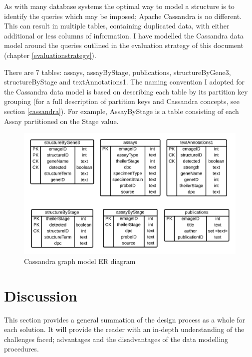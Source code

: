 As with many database systems the optimal way to model a structure is to identify the queries which may be imposed; Apache Cassandra is no different. This can result in multiple tables, containing duplicated data, with either additional or less columns of information. I have modelled the Cassandra data model around the queries outlined in the evaluation strategy of this document (chapter \ref{evaluationstrategy}).

There are 7 tables: assays, assayByStage, publications, structureByGene3, structureByStage and textAnnotations1. The naming convention I adopted for the Cassandra data model is based on describing each table by its partition key grouping (for a full description of partition keys and Cassandra concepts, see section \ref{cassandra}). For example, AssayByStage is a table consisting of each Assay partitioned on the Stage value.

\begin{figure}[H]\begin{center}\includegraphics[width=1\linewidth]{images/cass_model_er}\caption{Cassandra graph model ER diagram}\label{fig:cass1}\end{center}\end{figure}

\newpage
\section{Discussion}\label{designdiscussion}
This section provides a general summation of the design process as a whole for each solution. It will provide the reader with an in-depth understanding of the challenges faced; advantages and the disadvantages of the data modelling procedures.

